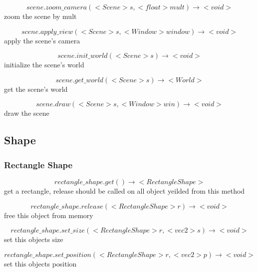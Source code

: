 \documentclass[11pt,fleqn]{book} %
\begin{document}
\begin{equation}
scene.zoom\_camera(<Scene> s, <float> mult) \rightarrow <void>
\end{equation}
zoom the scene by mult

\begin{equation}
scene.apply\_view(<Scene> s, <Window> window) \rightarrow <void>
\end{equation}
apply the scene's camera

\begin{equation}
scene.init\_world(<Scene> s) \rightarrow <void>
\end{equation}
initialize the scene's world

\begin{equation}
scene.get\_world(<Scene> s) \rightarrow <World>
\end{equation}
get the scene's world

\begin{equation}
scene.draw(<Scene> s, <Window> win) \rightarrow <void>
\end{equation}
draw the scene

\subsection{Shape}
\subsubsection{Rectangle Shape}

\begin{equation}
rectangle\_shape.get() \rightarrow <RectangleShape>
\end{equation}
get a rectangle, release should be called on all object yeilded from this method

\begin{equation}
rectangle\_shape.release(<RectangleShape> r) \rightarrow <void>
\end{equation}
free this object from memory

\begin{equation}
rectangle\_shape.set\_size(<RectangleShape> r, <vec2> s) \rightarrow <void>
\end{equation}
set this objects size

\begin{equation}
rectangle\_shape.set\_position(<RectangleShape> r, <vec2> p) \rightarrow <void>
\end{equation}
set this objects position
\end{document}
